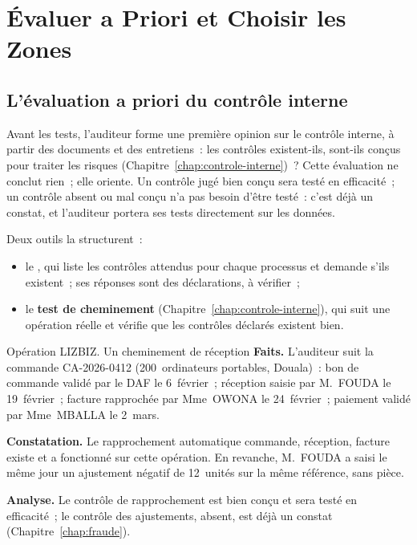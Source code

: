 \section{Évaluer a Priori et Choisir les Zones}
\label{sec:c08-risques}

\subsection{L'évaluation a priori du contrôle interne}

Avant les tests, l'auditeur forme une première opinion sur le contrôle
interne, à partir des documents et des entretiens~: les contrôles
existent-ils, sont-ils conçus pour traiter les risques
(Chapitre~\ref{chap:controle-interne})~? Cette évaluation ne conclut rien~;
elle oriente. Un contrôle jugé bien conçu sera testé en efficacité~; un
contrôle absent ou mal conçu n'a pas besoin d'être testé~: c'est déjà un
constat, et l'auditeur portera ses tests directement sur les données.

Deux outils la structurent~:
\begin{itemize}
    \item le , qui liste les contrôles attendus pour chaque
          processus et demande s'ils existent~; ses réponses sont des
          déclarations, à vérifier~;
    \item le \textbf{test de cheminement} (Chapitre~\ref{chap:controle-interne}),
          qui suit une opération réelle et vérifie que les contrôles déclarés
          existent bien.
\end{itemize}

\begin{boxscenario}{Opération LIZBIZ. Un cheminement de réception}
\textbf{Faits.} L'auditeur suit la commande CA-2026-0412 (200~ordinateurs
portables, Douala)~: bon de commande validé par le DAF le 6~février~;
réception saisie par M.~FOUDA le 19~février~; facture rapprochée par
Mme~OWONA le 24~février~; paiement validé par Mme~MBALLA le 2~mars.

\medskip
\textbf{Constatation.} Le rapprochement automatique commande, réception,
facture existe et a fonctionné sur cette opération. En revanche, M.~FOUDA a
saisi le même jour un ajustement négatif de 12~unités sur la même référence,
sans pièce.

\medskip
\textbf{Analyse.} Le contrôle de rapprochement est bien conçu et sera testé
en efficacité~; le contrôle des ajustements, absent, est déjà un constat
(Chapitre~\ref{chap:fraude}).
\end{boxscenario}

